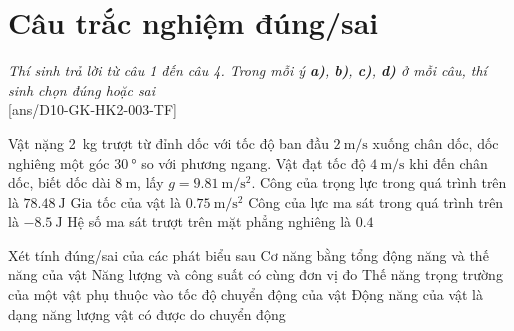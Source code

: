 \section{Câu trắc nghiệm đúng/sai} 
\textit{Thí sinh trả lời từ câu 1 đến câu 4. Trong mỗi ý \textbf{a)}, \textbf{b)}, \textbf{c)}, \textbf{d)} ở mỗi câu, thí sinh chọn đúng hoặc sai}
\setcounter{ex}{0}\\
[ans/D10-GK-HK2-003-TF]
\begin{ex}
	Vật nặng \SI{2}{\kilogram} trượt từ đỉnh dốc với tốc độ ban đầu $\SI{2}{\meter / \second}$ xuống chân dốc, dốc nghiêng một góc $\SI{30}{\degree}$ so với phương ngang. Vật đạt tốc độ $\SI{4}{\meter / \second}$ khi đến chân dốc, biết dốc dài $\SI{8}{\meter}$, lấy $g=\SI{9.81}{\meter / \second \squared}$.
	\choiceTF
	{\True Công của trọng lực trong quá trình trên là $\SI{78.48}{\joule}$}
	{Gia tốc của vật là $\SI{0.75}{\meter / \second \squared}$}
	{Công của lực ma sát trong quá trình trên là $\SI{-8.5}{\joule}$}
	{Hệ số ma sát trượt trên mặt phẳng nghiêng là $\SI{0.4}{}$}
\end{ex}
\begin{ex}
	Xét tính đúng/sai của các phát biểu sau
	\choiceTF
	{\True Cơ năng bằng tổng động năng và thế năng của vật}
	{Năng lượng và công suất có cùng đơn vị đo}
	{Thế năng trọng trường của một vật phụ thuộc vào tốc độ chuyển động của vật}
	{\True Động năng của vật là dạng năng lượng vật có được do chuyển động}
	\loigiai{
		
	}
\end{ex}
